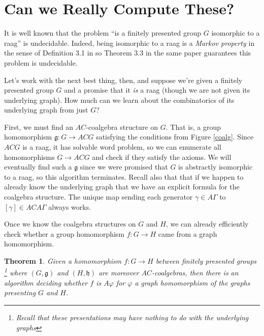 \documentclass[12pt]{article}
\newtheorem{thm}{Theorem}
\theoremstyle{definition}
\theoremstyle{theorem}
\begin{document}
\section{Can we Really Compute These?}
\label{computing}

It is well known that the problem 
``is a finitely presented group $G$ isomorphic to a raag'' 
is undecidable. Indeed, being isomorphic to a raag is a 
\emph{Markov property} in the sense of Definition 3.1 in \cite{millerDecisionProblemsGroups1992}
so Theorem 3.3 in the same paper guarantees this problem is undecidable.

Let's work with the next best thing, then, and suppose we're given a 
finitely presented group $G$ and a promise that it \emph{is} a raag 
(though we are not given its underlying graph). How much can we learn 
about the combinatorics of its underlying graph from just $G$?

First, we must find an $AC$-coalgebra structure on $G$. That is, a group 
homomorphism $\mathfrak{g} : G \to ACG$ satisfying the conditions from 
Figure \ref{coalg}. Since $ACG$ is a raag, it has solvable word problem, so 
we can enumerate all homomorphisms $G \to ACG$ and check if they satisfy the 
axioms. We will eventually find such a $\mathfrak{g}$ since we were 
promised that $G$ is abstractly isomorphic to a raag, so this algorithm 
terminates. Recall also that that if we happen to already know the underlying 
graph that we have an explicit formula for the coalgebra structure. The unique 
map sending each generator $\gamma \in A \Gamma$ to $[\gamma] \in ACA\Gamma$ 
always works.

Once we know the coalgebra structures on $G$ and $H$, we can already 
efficiently check whether a group homomorphism $f : G \to H$ came from a 
graph homomorphism.

\begin{thm}
  Given a homomorphism $f : G \to H$ between finitely presented groups%
  \footnote{Recall that these presentations may have nothing to do with the 
  underlying graphs} where $(G,\mathfrak{g})$ and $(H,\mathfrak{h})$ are 
  moreover $AC$-coalgebras, then there is an algorithm deciding 
  whether $f$ is $A \varphi$ for $\varphi$ a graph homomorphism of the graphs 
  presenting $G$ and $H$.
\end{thm}
\end{document}

